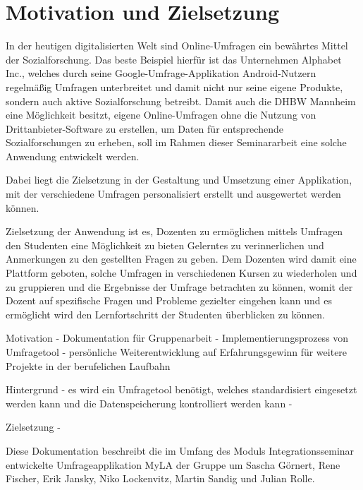 \section{Motivation und Zielsetzung}

In der heutigen digitalisierten Welt sind Online-Umfragen ein bewährtes Mittel der Sozialforschung.
Das beste Beispiel hierfür ist das Unternehmen Alphabet Inc., welches durch seine Google-Umfrage-Applikation Android-Nutzern regelmäßig Umfragen unterbreitet und damit nicht nur seine eigene Produkte, sondern auch aktive Sozialforschung betreibt.
Damit auch die \acs{DHBW} Mannheim eine Möglichkeit besitzt, eigene Online-Umfragen ohne die Nutzung von Drittanbieter-Software zu erstellen, um Daten für entsprechende Sozialforschungen zu erheben, soll im Rahmen dieser Seminararbeit eine solche Anwendung entwickelt werden.

Dabei liegt die Zielsetzung in der Gestaltung und Umsetzung einer Applikation, mit der verschiedene Umfragen personalisiert erstellt und ausgewertet werden können.


Zielsetzung der Anwendung ist es, Dozenten zu ermöglichen mittels Umfragen den Studenten eine Möglichkeit zu bieten Gelerntes zu verinnerlichen und Anmerkungen zu den gestellten Fragen zu geben.
Dem Dozenten wird damit eine Plattform geboten, solche Umfragen in verschiedenen Kursen zu wiederholen und zu gruppieren und die Ergebnisse der Umfrage betrachten zu können, womit der Dozent auf spezifische Fragen und Probleme gezielter eingehen kann und es ermöglicht wird den Lernfortschritt der Studenten überblicken zu können.
 

Motivation
- Dokumentation für Gruppenarbeit
- Implementierungsprozess von Umfragetool
- persönliche Weiterentwicklung auf Erfahrungsgewinn für weitere Projekte in der berufelichen Laufbahn

Hintergrund
- es wird ein Umfragetool benötigt, welches standardisiert eingesetzt werden kann und die Datenspeicherung kontrolliert werden kann
- 

Zielsetzung
-  

Diese Dokumentation beschreibt die im Umfang des Moduls Integrationsseminar entwickelte Umfrageapplikation MyLA der Gruppe um Sascha Görnert, Rene Fischer, Erik Jansky, Niko Lockenvitz, Martin Sandig und Julian Rolle.

